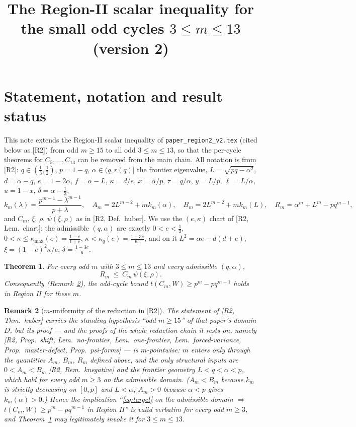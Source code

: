 \documentclass[11pt]{amsart}
\title[Region II for small odd cycles]{The Region-II scalar inequality for the small odd cycles $3\le m\le 13$\\ (version 2)}
\newtheorem{theorem}{Theorem}[section]
\newtheorem{remark}[theorem]{Remark}
\begin{document}
\maketitle

\section{Statement, notation and result status}\label{sec:intro}

This note extends the Region-II scalar inequality of
\texttt{paper\_region2\_v2.tex} (cited below as [R2]) from odd $m\ge15$ to all
odd $3\le m\le 13$, so that the per-cycle theorems for $C_5,\dots,C_{13}$ can
be removed from the main chain.  All notation is from [R2]:
$q\in(\tfrac13,\tfrac12)$, $p=1-q$, $\alpha\in(q,r(q)]$ the frontier
eigenvalue, $L=\sqrt{pq-\alpha^2}$, $d=\alpha-q$, $e=1-2\alpha$,
$f=\alpha-L$, $\kappa=d/e$, $x=\alpha/p$, $\tau=q/\alpha$, $y=L/p$,
$\ell=L/\alpha$, $u=1-x$, $\delta=\alpha-\tfrac13$,
\[
 k_m(\lambda)=\frac{p^{m-1}-\lambda^{m-1}}{p+\lambda},\quad
 A_m=2L^{m-2}+mk_m(\alpha),\quad
 B_m=2L^{m-2}+mk_m(L),\quad
 R_m=\alpha^m+L^m-pq^{m-1},
\]
and $C_m$, $\xi$, $\rho$, $\psi(\xi,\rho)$ as in [R2, Def.~huber].  We use the
$(e,\kappa)$ chart of [R2, Lem.~chart]: the admissible $(q,\alpha)$ are
exactly $0<e<\tfrac13$, $0<\kappa\le\kappa_{\max}(e)=\frac{1-e}{1+e}$,
$\kappa<\kappa_q(e)=\frac{1-3e}{6e}$, and on it
$L^2=\alpha e-d(d+e)$, $\xi=(1-e)^2\kappa/e$, $\delta=\frac{1-3e}{6}$.

\begin{theorem}\label{thm:main}
For every odd $m$ with $3\le m\le13$ and every admissible $(q,\alpha)$,
\begin{equation}\label{eq:target}
 R_m\ \le\ C_m\,\psi(\xi,\rho).
\end{equation}
Consequently (Remark~\ref{rem:muniform}), the odd-cycle bound
$t(C_m,W)\ge p^m-pq^{m-1}$ holds in Region II for these $m$.
\end{theorem}

\begin{remark}[$m$-uniformity of the reduction in {[R2]}]\label{rem:muniform}
The statement of [R2, Thm.~huber] carries the standing hypothesis
``odd $m\ge15$'' of that paper's domain $D$, but its proof --- and the proofs
of the whole reduction chain it rests on, namely
[R2, Prop.~shift, Lem.~no-frontier, Lem.~one-frontier,
Lem.~forced-variance, Prop.~master-defect, Prop.~psi-forms] --- is
$m$-pointwise: $m$ enters only through the quantities $A_m$, $B_m$, $R_m$
defined above, and the only structural inputs are
$0<A_m<B_m$ [R2, Rem.~knegative] and the frontier geometry $L<q<\alpha<p$,
which hold for every odd $m\ge3$ on the admissible domain.
($A_m<B_m$ because $k_m$ is strictly decreasing on $[0,p]$ and $L<\alpha$;
$A_m>0$ because $\alpha<p$ gives $k_m(\alpha)>0$.)
Hence the implication
``\eqref{eq:target} on the admissible domain $\Rightarrow$
$t(C_m,W)\ge p^m-pq^{m-1}$ in Region II'' is valid verbatim for every odd
$m\ge3$, and Theorem~\ref{thm:main} may legitimately invoke it for
$3\le m\le13$.
\end{remark}
\end{document}
